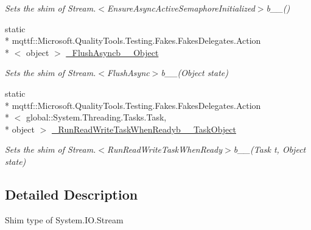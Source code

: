 \begin{DoxyCompactItemize}
\begin{DoxyCompactList}\small\item\em Sets the shim of Stream.$<$Ensure\-Async\-Active\-Semaphore\-Initialized$>$b\-\_\-\-\_()\end{DoxyCompactList}\item 
static \\*
mqttf\-::\-Microsoft.\-Quality\-Tools.\-Testing.\-Fakes.\-Fakes\-Delegates.\-Action\\*
$<$ object $>$ \hyperlink{class_system_1_1_i_o_1_1_fakes_1_1_shim_stream_a36f13b281fa4d488a0bcdeea73d17a3b}{\-\_\-\-Flush\-Asyncb\-\_\-\-\_\-Object}
\begin{DoxyCompactList}\small\item\em Sets the shim of Stream.$<$Flush\-Async$>$b\-\_\-\-\_(\-Object state)\end{DoxyCompactList}\item 
static \\*
mqttf\-::\-Microsoft.\-Quality\-Tools.\-Testing.\-Fakes.\-Fakes\-Delegates.\-Action\\*
$<$ global\-::\-System.\-Threading.\-Tasks.\-Task, \\*
object $>$ \hyperlink{class_system_1_1_i_o_1_1_fakes_1_1_shim_stream_a9716101748ea9e7357bfa3364473a977}{\-\_\-\-Run\-Read\-Write\-Task\-When\-Readyb\-\_\-\-\_\-Task\-Object}
\begin{DoxyCompactList}\small\item\em Sets the shim of Stream.$<$Run\-Read\-Write\-Task\-When\-Ready$>$b\-\_\-\-\_(\-Task t, Object state)\end{DoxyCompactList}\end{DoxyCompactItemize}


\subsection{Detailed Description}
Shim type of System.\-I\-O.\-Stream



